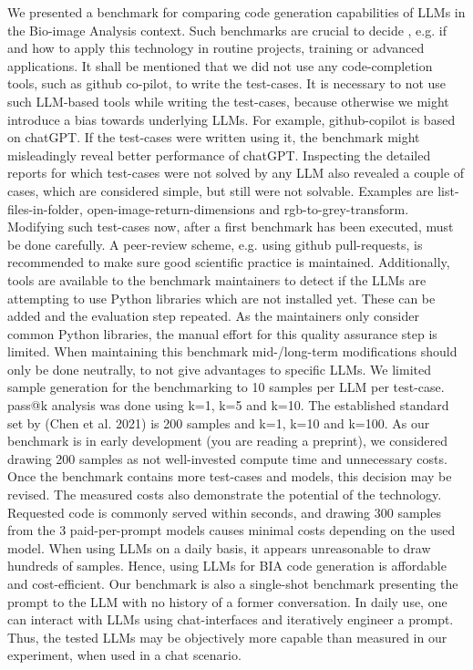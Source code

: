 \documentclass[doubleblind]{ecai}
\begin{document}
We presented a benchmark for comparing code generation capabilities of LLMs in the Bio-image Analysis context. Such benchmarks are crucial to decide , e.g. if and how to apply this technology in routine projects, training or advanced applications. 
It shall be mentioned that we did not use any code-completion tools, such as github co-pilot, to write the test-cases. It is necessary to not use such LLM-based tools while writing the test-cases, because otherwise we might introduce a bias towards underlying LLMs. For example, github-copilot is based on chatGPT. If the test-cases were written using it, the benchmark might misleadingly reveal better performance of chatGPT.
Inspecting the detailed reports for which test-cases were not solved by any LLM also revealed a couple of cases, which are considered simple, but still were not solvable. Examples are list-files-in-folder, open-image-return-dimensions and rgb-to-grey-transform. Modifying such test-cases now, after a first benchmark has been executed, must be done carefully. A peer-review scheme, e.g. using github pull-requests, is recommended to make sure good scientific practice is maintained. Additionally, tools are available to the benchmark maintainers to detect if the LLMs are attempting to use Python libraries which are not installed yet. These can be added and the evaluation step repeated. As the maintainers only consider common Python libraries, the manual effort for this quality assurance step is limited. When maintaining this benchmark mid-/long-term modifications should only be done neutrally, to not give advantages to specific LLMs.
We limited sample generation for the benchmarking to 10 samples per LLM per test-case. pass@k analysis was done using k=1, k=5 and k=10. The established standard set by (Chen et al. 2021) is 200 samples and k=1, k=10 and k=100. As our benchmark is in early development (you are reading a preprint), we considered drawing 200 samples as not well-invested compute time and unnecessary costs. Once the benchmark contains more test-cases and models, this decision may be revised. 
The measured costs also demonstrate the potential of the technology. Requested code is commonly served within seconds, and drawing 300 samples from the 3 paid-per-prompt models causes minimal costs depending on the used model. When using LLMs on a daily basis, it appears unreasonable to draw hundreds of samples. Hence, using LLMs for BIA code generation is affordable and cost-efficient. 
Our benchmark is also a single-shot benchmark presenting the prompt to the LLM with no history of a former conversation. In daily use, one can interact with LLMs using chat-interfaces and iteratively engineer a prompt. Thus, the tested LLMs may be objectively more capable than measured in our experiment, when used in a chat scenario.
\end{document}
